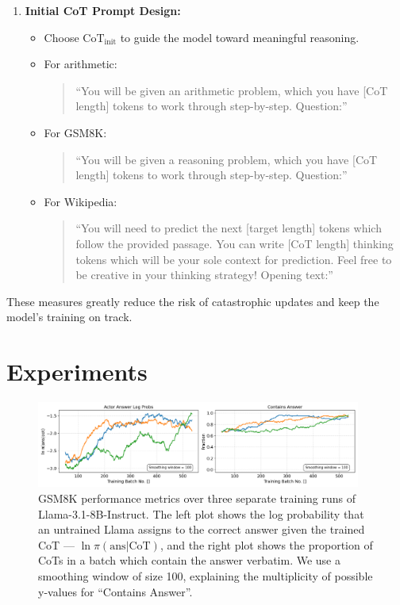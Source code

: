 \documentclass{article}
\theoremstyle{plain}
\theoremstyle{definition}
\theoremstyle{remark}
\begin{document}
\begin{enumerate}
    \item \textbf{Initial CoT Prompt Design:} 
    \begin{itemize}
        \item Choose $\text{CoT}_{\text{init}}$ to guide the model toward meaningful reasoning. 
        \item For arithmetic: 
        \begin{quote}
            \small
            ``You will be given an arithmetic problem, which you have [CoT length] tokens to work through step-by-step. Question:''
        \end{quote}
        \item For GSM8K:
        \begin{quote}
            \small
            ``You will be given a reasoning problem, which you have [CoT length] tokens to work through step-by-step. Question:''
        \end{quote}
        \item For Wikipedia:
        \begin{quote}
            \small
            ``You will need to predict the next [target length] tokens which follow the provided passage. You can write [CoT length] thinking tokens which will be your sole context for prediction. Feel free to be creative in your thinking strategy! Opening text:''
        \end{quote}
    \end{itemize}
\end{enumerate}

These measures greatly reduce the risk of catastrophic updates and keep the model’s training on track.



\section{Experiments}
\label{sec:experiments}
\begin{figure}
    \centering
    \includegraphics[width=0.95\textwidth]{"Figures/llama_combined_metrics_gsm8k.png"}
    \caption{GSM8K performance metrics over three separate training runs of Llama-3.1-8B-Instruct. The left plot shows the log probability that an untrained Llama assigns to the correct answer given the trained CoT --- $\ln \pi(\text{ans}|\text{CoT})$, and the right plot shows the proportion of CoTs in a batch which contain the answer verbatim. We use a smoothing window of size 100, explaining the multiplicity of possible y-values for ``Contains Answer''.}
    \label{fig:gsm8k_performance}
\end{figure}
\end{document}
